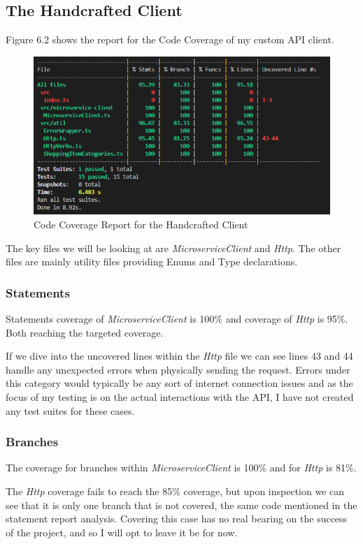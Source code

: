 \subsection{The Handcrafted Client}
Figure 6.2 shows the report for the Code Coverage of my custom API client.
\begin{figure}[!htb]
\caption{Code Coverage Report for the Handcrafted Client}
\centering
\includegraphics[scale=0.70]{FYP_Dissertation_template/Figures/handcrafted-client-code-coverage.PNG}
\end{figure}
\FloatBarrier

The key files we will be looking at are \textit{MicroserviceClient} and \textit{Http}. The other files are mainly utility files providing Enums and Type declarations.
\subsubsection{Statements}
Statements coverage of \textit{MicroserviceClient} is 100\% and coverage of \textit{Http} is 95\%. Both reaching the targeted coverage.

If we dive into the uncovered lines within the \textit{Http} file we can see lines 43 and 44 handle any unexpected errors when physically sending the request. Errors under this category would typically be any sort of internet connection issues and as the focus of my testing is on the actual interactions with the API, I have not created any test suites for these cases.
\subsubsection{Branches}
The coverage for branches within \textit{MicroserviceClient} is 100\% and for \textit{Http} is 81\%.

The \textit{Http} coverage fails to reach the 85\% coverage, but upon inspection we can see that it is only one branch that is not covered, the same code mentioned in the statement report analysis. Covering this case has no real bearing on the success of the project, and so I will opt to leave it be for now.
